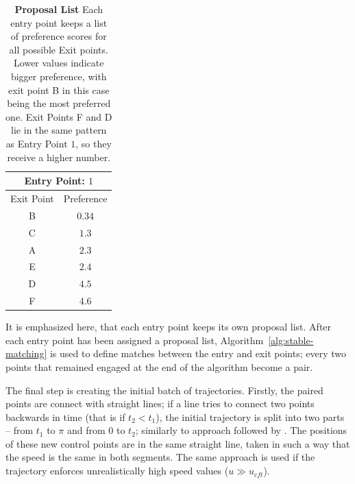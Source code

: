 \begin{table}[b]
	\centering
	\caption{
	\textbf{Proposal List} Each entry point keeps a list of preference scores for all possible Exit points.
	Lower values indicate bigger preference, with exit point B in this case being the most preferred one.
	Exit Points F and D lie in the same pattern as Entry Point $1$, so they receive a higher number.
	}
	\begin{tabular}{c|c}
		\hline
		\multicolumn{2}{c}{Entry Point: $1$}	\\
 		\hline
 		\hline
		Exit Point	&	Preference\\
		\hline
		B	&	$\mathbf{0.34}$	\\
		C	&	$1.3$			\\
		A	&	$2.3$			\\
		E	&	$2.4$			\\
		D	&	$4.5$			\\
		F	&	$4.6$			\\
		\hline
		\end{tabular}
	\label{tab:proposal-list}
\end{table}

It is emphasized here, that each entry point keeps its own proposal list.
After each entry point has been assigned a proposal list, Algorithm~\ref{alg:stable-matching} is used to define matches between the entry and exit points;
every two points that remained engaged at the end of the algorithm become a pair.

The final step is creating the initial batch of trajectories.
Firstly, the paired points are connect with straight lines;
if a line tries to connect two points backwards in time (that is if $t_2 < t_1$), the initial trajectory is split into two parts -- from $t_1$ to $\pi$ and from $0$ to $t_2$; similarly to approach followed by \cite{Yersin:2009}.
The positions of these new control points are in the same straight line, taken in such a way that the speed is the same in both segments.
The same approach is used if the trajectory enforces unrealistically high speed values ($u \gg u_{cft}$).

